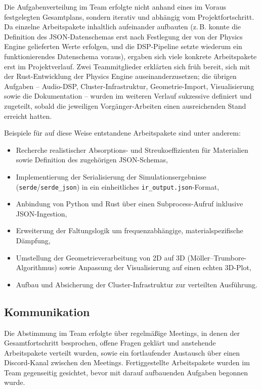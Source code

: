 Die Aufgabenverteilung im Team erfolgte nicht anhand eines im Voraus
festgelegten Gesamtplans, sondern iterativ und abhängig vom
Projektfortschritt. Da einzelne Arbeitspakete inhaltlich aufeinander
aufbauten (z.\,B. konnte die Definition des JSON-Datenschemas erst nach
Festlegung der von der Physics Engine gelieferten Werte erfolgen, und die
DSP-Pipeline setzte wiederum ein funktionierendes Datenschema voraus),
ergaben sich viele konkrete Arbeitspakete erst im Projektverlauf. Zwei
Teammitglieder erklärten sich früh bereit, sich mit der Rust-Entwicklung
der Physics Engine auseinanderzusetzen; die übrigen Aufgaben -- Audio-DSP,
Cluster-Infrastruktur, Geometrie-Import, Visualisierung sowie die
Dokumentation -- wurden im weiteren Verlauf sukzessive definiert und
zugeteilt, sobald die jeweiligen Vorgänger-Arbeiten einen ausreichenden
Stand erreicht hatten.

Beispiele für auf diese Weise entstandene Arbeitspakete sind unter
anderem:
\begin{itemize}
    \item Recherche realistischer Absorptions- und Streukoeffizienten für
    Materialien sowie Definition des zugehörigen JSON-Schemas,
    \item Implementierung der Serialisierung der Simulationsergebnisse
    (\texttt{serde}/\texttt{serde\_json}) in ein einheitliches
    \texttt{ir\_output.json}-Format,
    \item Anbindung von Python und Rust über einen Subprocess-Aufruf
    inklusive JSON-Ingestion,
    \item Erweiterung der Faltungslogik um frequenzabhängige,
    materialspezifische Dämpfung,
    \item Umstellung der Geometrieverarbeitung von 2D auf 3D
    (Möller--Trumbore-Algorithmus) sowie Anpassung der Visualisierung
    auf einen echten 3D-Plot,
    \item Aufbau und Absicherung der Cluster-Infrastruktur zur verteilten
    Ausführung.
\end{itemize}

\subsection{Kommunikation}
\label{sec:kommunikation}

Die Abstimmung im Team erfolgte über regelmäßige
Meetings, in denen der Gesamtfortschritt besprochen, offene Fragen
geklärt und anstehende Arbeitspakete verteilt wurden, sowie ein
fortlaufender Austausch über einen Discord-Kanal zwischen den Meetings.
Fertiggestellte Arbeitspakete wurden im Team gegenseitig gesichtet, bevor
mit darauf aufbauenden Aufgaben begonnen wurde.

